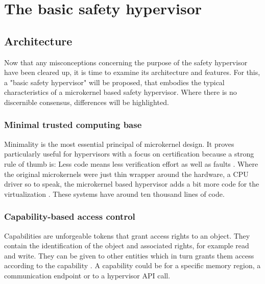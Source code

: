 
\chapter{The basic safety hypervisor} %

\label{Chapter2} %


\newcommand{\keyword}[1]{\textbf{#1}}
\newcommand{\tabhead}[1]{\textbf{#1}}
\newcommand{\code}[1]{\texttt{#1}}
\newcommand{\file}[1]{\texttt{\bfseries#1}}
\newcommand{\option}[1]{\texttt{\itshape#1}}


\section{Architecture}
Now that any misconceptions concerning the purpose of the safety hypervisor have been cleared up, it is time to examine its architecture and features. For this, a "basic safety hypervisor" will be proposed, that embodies the typical characteristics of a microkernel based safety hypervisor. Where there is no discernible consensus, differences will be highlighted.

\subsection{Minimal trusted computing base}
Minimality is the most essential principal of microkernel design. It proves particularly useful for hypervisors with a focus on certification because a strong rule of thumb is: Less code means less verification effort as well as faults \cite{Lipow.1982}.  
Where the original microkernels were just thin wrapper around the hardware, a \gls{CPU} driver so to speak, the microkernel based hypervisor adds a bit more code for the virtualization \cite{Heiser.2010}. These systems have around ten thousand lines of code.

\subsection{Capability-based access control}
Capabilities are unforgeable tokens that grant access rights to an object. They contain the identification of the object and associated rights, for example read and write.
They can be given to other entities which in turn grants them access according to the capability \cite{Levy.1984}. A capability could be for a specific memory region, a communication endpoint or to a hypervisor \gls{API} call.

